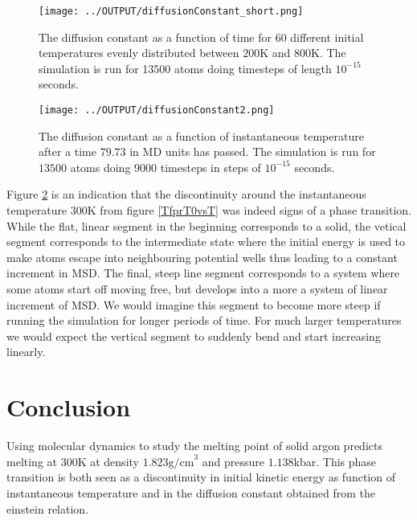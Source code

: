 \documentclass[twoside,utf8]{article}
\begin{document}
\begin{multicols}{2}
\begin{figure}[H]
\begin{center}
\texttt{[image: ../OUTPUT/diffusionConstant\_short.png]}
\end{center}
\caption{
The diffusion constant as a function of time for 60 different initial temperatures evenly distributed between $200$K and $800$K. The simulation is run for 13500 atoms doing timesteps of length $10^{-15}$ seconds.
}
\label{diffusionConstant}
\end{figure}




\begin{figure}[H]
\begin{center}
\texttt{[image: ../OUTPUT/diffusionConstant2.png]}
\end{center}
\caption{
The diffusion constant as a function of instantaneous temperature after a time $79.73$ in MD units has passed. The simulation is run for $13500$ atoms doing $9000$ timesteps in steps of $10^{-15}$ seconds. 
}
\label{diffusionConstant2}
\end{figure}

\noindent
Figure \ref*{diffusionConstant2} is an indication that the discontinuity around the instantaneous temperature $300$K from figure \ref*{TfprT0vsT} was indeed signs of a phase transition. While the flat, linear segment in the beginning corresponds to a solid, the vetical segment corresponds to the intermediate state where the initial energy is used to make atoms escape into neighbouring potential wells thus leading to a constant increment in MSD. The final, steep line segment corresponds to a system where some atoms start off moving free, but develops into a more a system of linear increment of MSD. We would imagine this segment to become more steep if running the simulation for longer periods of time. For much larger temperatures we would expect the vertical segment to suddenly bend and start increasing linearly. 



\section{Conclusion}
Using molecular dynamics to study the melting point of solid argon predicts melting at $300$K at density $1.823 \text{g/cm}^3$ and pressure $1.138$kbar. This phase transition is both seen as a discontinuity in initial kinetic energy as function of instantaneous temperature and in the diffusion constant obtained from the einstein relation. 



\end{multicols}
\end{document}
